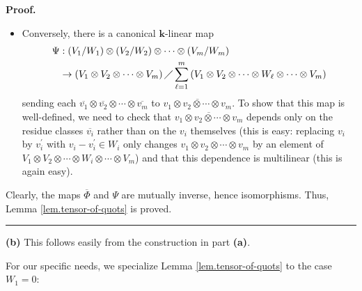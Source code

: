 \documentclass[numbers=enddot,12pt,final,onecolumn,notitlepage]{scrartcl}%
\theoremstyle{definition}
\newenvironment{noncompile}{}{}
\newenvironment{proof}[1][Proof]{\noindent\textbf{#1.} }{\ \rule{0.5em}{0.5em}}
\let\sumnonlimits\sum
\renewcommand{\sum}{\sumnonlimits\limits}
\begin{document}
\begin{proof}
\begin{itemize}
\item Conversely, there is a canonical $\mathbf{k}$-linear map%
\begin{align*}
\Psi &  :\left(  V_{1}/W_{1}\right)  \otimes\left(  V_{2}/W_{2}\right)
\otimes\cdots\otimes\left(  V_{m}/W_{m}\right) \\
&  \rightarrow\left(  V_{1}\otimes V_{2}\otimes\cdots\otimes V_{m}\right)
\diagup\sum_{\ell=1}^{m}\left(  V_{1}\otimes V_{2}\otimes\cdots\otimes
W_{\ell}\otimes\cdots\otimes V_{m}\right)
\end{align*}
sending each $\overline{v_{1}}\otimes\overline{v_{2}}\otimes\cdots
\otimes\overline{v_{m}}$ to $\overline{v_{1}\otimes v_{2}\otimes\cdots\otimes
v_{m}}$. To show that this map is well-defined, we need to check that
$\overline{v_{1}\otimes v_{2}\otimes\cdots\otimes v_{m}}$ depends only on the
residue classes $\overline{v_{i}}$ rather than on the $v_{i}$ themselves (this
is easy: replacing $v_{i}$ by $v_{i}^{\prime}$ with $v_{i}-v_{i}^{\prime}\in
W_{i}$ only changes $v_{1}\otimes v_{2}\otimes\cdots\otimes v_{m}$ by an
element of $V_{1}\otimes V_{2}\otimes\cdots\otimes W_{i}\otimes\cdots\otimes
V_{m}$) and that this dependence is multilinear (this is again easy).
\end{itemize}

Clearly, the maps $\overline{\Phi}$ and $\Psi$ are mutually inverse, hence
isomorphisms. Thus, Lemma \ref{lem.tensor-of-quots} is proved.
\end{proof}

\begin{noncompile}
\textbf{(b)} This follows easily from the construction in part \textbf{(a)}.
\end{noncompile}

For our specific needs, we specialize Lemma \ref{lem.tensor-of-quots} to the
case $W_{1}=0$:
\end{document}
